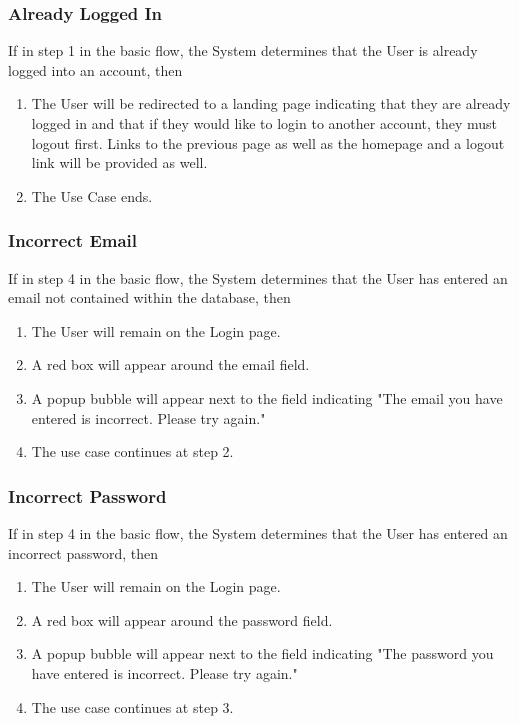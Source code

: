 \documentclass[a4paper,11pt]{article}
\begin{document}
\subsubsection{Already Logged In}
If in step 1 in the basic flow, the System determines that the User is already logged into an account, then
\begin{enumerate}
\item The User will be redirected to a landing page indicating that they are already logged in and that if they would like to login to another account, they must logout first. Links to the previous page as well as the homepage and a logout link will be provided as well.
\item The Use Case ends.
\end{enumerate}

\subsubsection{Incorrect Email}
If in step 4 in the basic flow, the System determines that the User has entered an email not contained within the database, then
\begin{enumerate}
\item The User will remain on the Login page.
\item A red box will appear around the email field.
\item A popup bubble will appear next to the field indicating "The email you have entered is incorrect. Please try again."
\item The use case continues at step 2.
\end{enumerate}

\subsubsection{Incorrect Password}
If in step 4 in the basic flow, the System determines that the User has entered an incorrect password, then
\begin{enumerate}
\item The User will remain on the Login page.
\item A red box will appear around the password field.
\item A popup bubble will appear next to the field indicating "The password you have entered is incorrect. Please try again."
\item The use case continues at step 3.
\end{enumerate}
\end{document}
